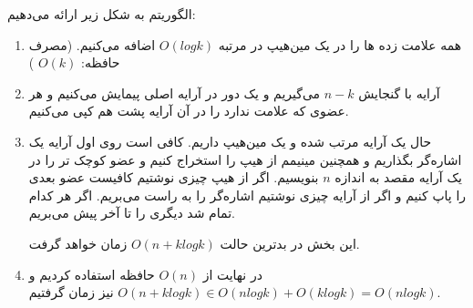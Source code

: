 الگوریتم به شکل زیر ارائه می‌دهیم:

\begin{enumerate}
	\item 
	همه علامت زده ها را در یک مین‌هیپ در مرتبه 
$O(logk)$
	اضافه می‌کنیم.
(مصرف حافظه:
$O(k)$
)

\item 
آرایه با گنجایش 
$n-k$
می‌گیریم و یک دور در آرایه اصلی پیمایش می‌کنیم
و هر عضوی که علامت ندارد را در آن آرایه پشت‌ هم کپی می‌کنیم.

\item
حال یک آرایه مرتب شده و یک مین‌هیپ داریم. کافی است روی اول آرایه یک اشاره‌گر بگذاریم و همچنین مینیمم از هیپ را استخراج کنیم و عضو کوچک تر را در یک آرایه مقصد به اندازه $n$ بنویسیم. اگر از هیپ چیزی نوشتیم کافیست عضو بعدی را پاپ کنیم و اگر از آرایه چیزی نوشتیم اشاره‌گر را به راست می‌بریم. اگر هر کدام تمام شد دیگری را تا آخر پیش‌ می‌بریم. 

 این بخش در بدترین حالت 
$O(n+klogk)$ 
زمان خواهد گرفت.

\item
در نهایت از 
$O(n)$
حافظه استفاده کردیم
و 
$O(n + klogk) \in O(nlogk) + O(klogk) = O(nlogk)$
نیز زمان گرفتیم.

\end{enumerate}